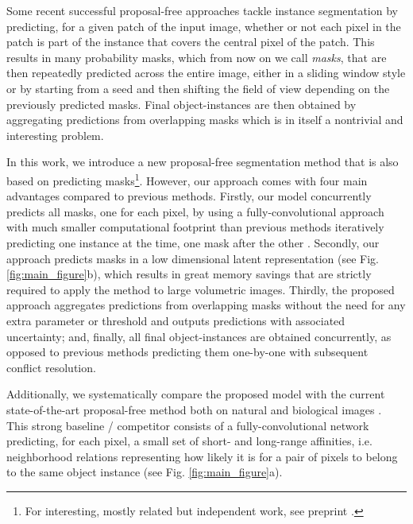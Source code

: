  
Some recent successful proposal-free approaches \cite{januszewski2018high,liu2016multi,meirovitch2016multi} tackle instance segmentation by predicting, for a given patch of the input image, whether or not each pixel in the patch is part of the instance that covers the central pixel of the patch. 
This results in many probability masks, which from now on we call \emph{\maskname masks}, that are then repeatedly predicted across the entire image, either in a sliding window style or by starting from a seed and then shifting the field of view depending on the previously predicted masks. 
Final object-instances are then obtained by aggregating predictions from overlapping masks which is in itself a nontrivial and interesting problem.

In this work, we introduce a new proposal-free segmentation method that is also based on predicting \maskname masks\footnote{For interesting, mostly related but independent work, see preprint \cite{hirsch2020patchperpix}.}. However, our approach comes with four main advantages compared to previous methods.
Firstly, our model concurrently predicts all \maskname masks, one for each pixel, by using a fully-convolutional approach with much smaller computational footprint than previous methods iteratively predicting one instance at the time, one mask after the other \cite{januszewski2018high,meirovitch2016multi}.
Secondly, our approach predicts \maskname masks in a low dimensional latent representation (see Fig. \ref{fig:main_figure}b), which results in great memory savings that are strictly required to apply the method to large volumetric images. 
Thirdly, the proposed approach aggregates predictions from overlapping \maskname masks without the need for any extra parameter or threshold and outputs predictions with associated uncertainty;
and, finally, all final object-instances are obtained concurrently, as opposed to previous methods predicting them one-by-one with subsequent conflict resolution. 


Additionally, we systematically compare the proposed model with the current state-of-the-art proposal-free method both on natural and biological images \cite{liu2018affinity,Gao_2019_ICCV,lee2017superhuman,wolf2018mutex,bailoni2019generalized}. This strong baseline / competitor consists of a fully-convolutional network predicting, for each pixel, a small set of short- and long-range affinities, i.e. neighborhood relations representing how likely it is for a pair of pixels to belong to the same object instance (see Fig. \ref{fig:main_figure}a). 

